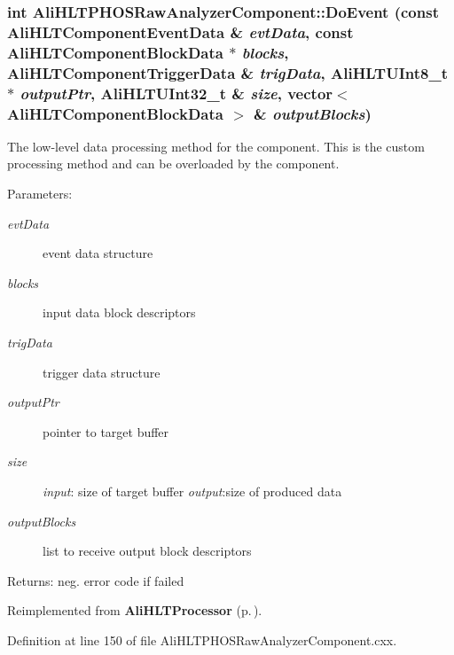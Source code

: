 \subsubsection{\setlength{\rightskip}{0pt plus 5cm}int Ali\-HLTPHOSRaw\-Analyzer\-Component::Do\-Event (const {\bf Ali\-HLTComponent\-Event\-Data} \& {\em evt\-Data}, const {\bf Ali\-HLTComponent\-Block\-Data} $\ast$ {\em blocks}, {\bf Ali\-HLTComponent\-Trigger\-Data} \& {\em trig\-Data}, {\bf Ali\-HLTUInt8\_\-t} $\ast$ {\em output\-Ptr}, {\bf Ali\-HLTUInt32\_\-t} \& {\em size}, vector$<$ {\bf Ali\-HLTComponent\-Block\-Data} $>$ \& {\em output\-Blocks})\hspace{0.3cm}{\tt  [private, virtual]}}\label{classAliHLTPHOSRawAnalyzerComponent_d0}


The low-level data processing method for the component. This is the custom processing method and can be overloaded by the component. \begin{Desc}
\item[Parameters:]
\begin{description}
\item[{\em evt\-Data}]event data structure \item[{\em blocks}]input data block descriptors \item[{\em trig\-Data}]trigger data structure \item[{\em output\-Ptr}]pointer to target buffer \item[{\em size}]{\em input\/}: size of target buffer {\em output\/}:size of produced data \item[{\em output\-Blocks}]list to receive output block descriptors \end{description}
\end{Desc}
\begin{Desc}
\item[Returns:]neg. error code if failed \end{Desc}


Reimplemented from {\bf Ali\-HLTProcessor} {\rm (p.\,\pageref{classAliHLTProcessor_d0})}.

Definition at line 150 of file Ali\-HLTPHOSRaw\-Analyzer\-Component.cxx.

